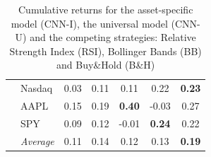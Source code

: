 \documentclass[11pt, a4paper]{article}
\begin{document}
\begin{table}[H]
\begin{tabular}{l|l|ccccc}
  & Nasdaq           & 0.03              & 0.11          & 0.11          & 0.22          & \textbf{0.23} \\
  & AAPL             & 0.15              & 0.19          & \textbf{0.40} & -0.03         & 0.27          \\
  & SPY              & 0.09              & 0.12          & -0.01         & \textbf{0.24} & 0.22          \\ \cline{2-7}
  & \textit{Average} & 0.11              & 0.14          & 0.12          & 0.13          & \textbf{0.19}
\end{tabular}
\caption{Cumulative returns for the asset-specific model (CNN-I), the universal model (CNN-U) and the competing strategies: Relative Strength Index (RSI), Bollinger Bands (BB) and Buy\&Hold (B\&H)}
\label{tbl:Cummulative}
\end{table}
\end{document}
